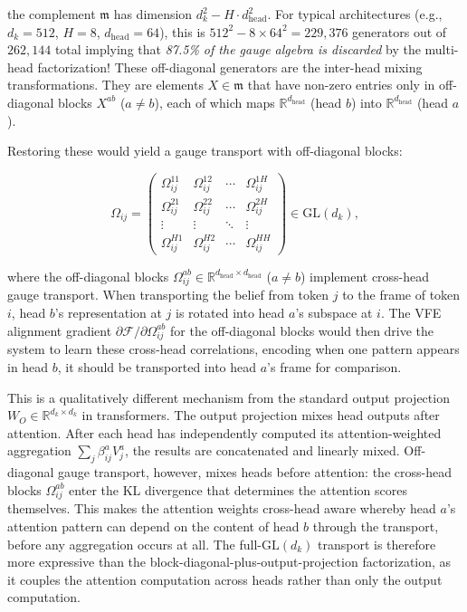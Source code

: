 \documentclass[twoside,11pt]{article}
\begin{document}
the complement $\mathfrak{m}$ has dimension $d_k^2 - H \cdot d_{\text{head}}^2$. For typical architectures (e.g., $d_k = 512$, $H = 8$, $d_{\text{head}} = 64$), this is $512^2 - 8 \times 64^2 = 229{,}376$ generators out of $262{,}144$ total implying that \emph{87.5\% of the gauge algebra is discarded} by the multi-head factorization! These off-diagonal generators are the inter-head mixing transformations. They are elements $X \in \mathfrak{m}$ that have non-zero entries only in off-diagonal blocks $X^{ab}$ ($a \neq b$), each of which maps $\mathbb{R}^{d_{\text{head}}}$ (head $b$) into $\mathbb{R}^{d_{\text{head}}}$ (head $a$).

Restoring these would yield a gauge transport with off-diagonal blocks:

\begin{equation}
\Omega_{ij} = \begin{pmatrix}
\Omega_{ij}^{11} & \Omega_{ij}^{12} & \cdots & \Omega_{ij}^{1H} \\
\Omega_{ij}^{21} & \Omega_{ij}^{22} & \cdots & \Omega_{ij}^{2H} \\
\vdots & \vdots & \ddots & \vdots \\
\Omega_{ij}^{H1} & \Omega_{ij}^{H2} & \cdots & \Omega_{ij}^{HH}
\end{pmatrix} \in \mathrm{GL}(d_k),
\label{eq:full_gauge_transport}
\end{equation}

where the off-diagonal blocks $\Omega_{ij}^{ab} \in \mathbb{R}^{d_{\text{head}} \times d_{\text{head}}}$ ($a \neq b$) implement cross-head gauge transport. When transporting the belief from token $j$ to the frame of token $i$, head $b$'s representation at $j$ is rotated into head $a$'s subspace at $i$. The VFE alignment gradient $\partial \mathcal{F}/\partial \Omega_{ij}^{ab}$ for the off-diagonal blocks would then drive the system to learn these cross-head correlations, encoding when one pattern appears in head $b$, it should be transported into head $a$'s frame for comparison.

This is a qualitatively different mechanism from the standard output projection $W_O \in \mathbb{R}^{d_k \times d_k}$ in transformers. The output projection mixes head outputs after attention. After each head has independently computed its attention-weighted aggregation $\sum_j \beta_{ij}^a V_j^a$, the results are concatenated and linearly mixed. Off-diagonal gauge transport, however, mixes heads before attention: the cross-head blocks $\Omega_{ij}^{ab}$ enter the KL divergence that determines the attention scores themselves. This makes the attention weights cross-head aware whereby head $a$'s attention pattern can depend on the content of head $b$ through the transport, before any aggregation occurs at all. The full-$\mathrm{GL}(d_k)$ transport is therefore more expressive than the block-diagonal-plus-output-projection factorization, as it couples the attention computation across heads rather than only the output computation.
\end{document}
